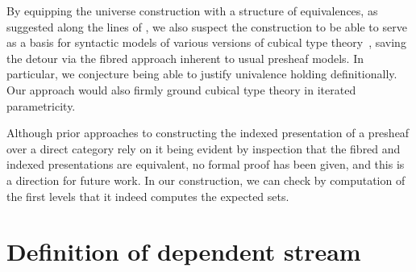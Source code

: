 \documentclass{msc}
\begin{document}
By equipping the universe construction with a structure of equivalences, as suggested along the lines of \cite{altenkirch15}, we also suspect the construction to be able to serve as a basis for syntactic models of various versions of cubical type theory~\citep{bezem13,cohen16,angiuli21}, saving the detour via the fibred approach inherent to usual presheaf models. In particular, we conjecture being able to justify univalence holding definitionally. Our approach would also firmly ground cubical type theory in iterated parametricity.

Although prior approaches to constructing the indexed presentation of a presheaf over a direct category rely on it being evident by inspection that the fibred and indexed presentations are equivalent, no formal proof has been given, and this is a direction for future work. In our construction, we can check by computation of the first levels that it indeed computes the expected sets.

\newpage



\appendix
\section{Definition of dependent stream\label{app:depstream}}
\end{document}
